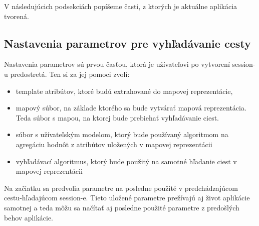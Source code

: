 V následujúcich podsekciách popíšeme časti, z ktorých je aktuálne  aplikácia tvorená.

\subsection{Nastavenia parametrov pre vyhľadávanie cesty}

Nastavenia parametrov sú prvou časťou, ktorá je užívateľovi po vytvorení session-u predostretá. Ten si za jej pomoci zvolí:

\begin{itemize}
    \item template atribútov, ktoré budú extrahované do mapovej reprezentácie, 
    \item mapový súbor, na základe ktorého sa bude vytvárať mapová reprezentácia. Teda súbor s mapou, na ktorej bude prebiehať vyhľadávanie ciest.
    \item súbor s užívateľským modelom, ktorý bude používaný algoritmom na agregáciu hodnôt z atribútov uložených v mapovej reprezentácii  
    \item vyhľadávací algoritmus, ktorý bude použitý na samotné hľadanie ciest v mapovej reprezentácii
\end{itemize}

Na začiatku sa predvolia parametre na posledne použité v predchádzajúcom cestu-hľadajúcom session-e. Tieto uložené parametre prežívajú aj život aplikácie samotnej a teda môžu sa načítať aj posledne použité parametre z predošlých behov aplikácie.

